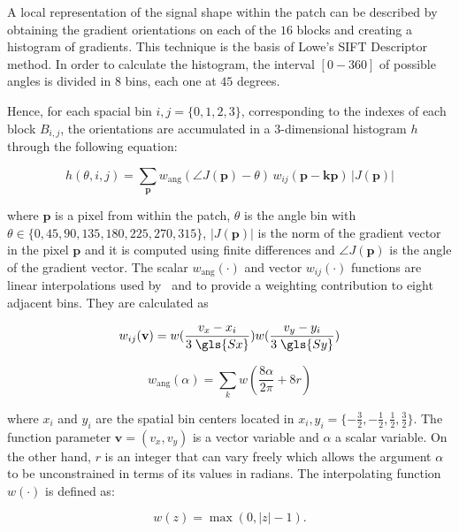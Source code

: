 A local representation of the signal shape within the patch can be described by obtaining the gradient orientations on each of the $16$ blocks and creating a histogram of gradients.  This technique is the basis of Lowe's SIFT Descriptor method. In order to calculate the histogram, the interval $[0-360]$ of possible angles is divided in $8$ bins, each one at $45$ degrees.

 Hence, for each spacial bin $ i,j = \{0,1,2,3\} $, corresponding to the indexes of each block $B_{i,j}$,  the orientations are accumulated in a  $3$-dimensional histogram $h$ through the following equation: 
 

\begin{equation}
 h(\theta,i,j) = \sum_{\mathbf{p}} w_\mathrm{ang}(\angle J(\mathbf{p}) - \theta)\, w_{ij}\left(\mathbf{p} - \mathbf{kp} \right)\, |J(\mathbf{p})|
\label{eq:histogram}
\end{equation}

\noindent  where $\mathbf{p}$ is a pixel from within the patch,  $\theta$ is the angle bin with $ \theta \in \{0, 45, 90, 135, 180, 225, 270, 315\} $,  $ |J(\mathbf{p})| $ is the norm of the gradient vector in the pixel $\mathbf{p}$ and it is computed using finite differences and $\angle J(\mathbf{p}) $ is the angle of the gradient vector.  The scalar $ w_\mathrm{ang}(\cdot) $  and vector $ w_{ij}(\cdot) $ functions are linear interpolations used by~\cite{Lowe2004} and \cite{Vedaldi2010} to provide a weighting contribution to eight adjacent bins.  They are calculated as  

\begin{equation}
 w_{ij}(\mathbf{v}) = w( \frac{v_x - x_i}{3 \; \gls{Sx}} ) w( \frac{v_y - y_i}{3 \; \gls{Sy}} ) 
\label{eq:ij}
\end{equation}

\begin{equation}
 w_\mathrm{ang}(\alpha) = \sum_{k} w( \frac{8\alpha}{2\pi} + 8r)
\label{eq:wang}
\end{equation}

\noindent where $x_i$ and $y_i$ are the spatial bin centers located in $ x_i,y_i = \{-\frac{3}{2},-\frac{1}{2},\frac{1}{2},\frac{3}{2}\} $. The function parameter $\mathbf{v} = ( v_x, v_y ) $ is a vector variable and $\alpha$ a scalar variable.  On the other hand, $r$ is an integer that can vary freely which allows the argument $\alpha$ to be unconstrained in terms of its values in radians. The interpolating function $w(\cdot)$ is defined as:

\begin{equation}
 w(z) = \max(0,|z|-1).
\label{eq:weighting}
\end{equation}

